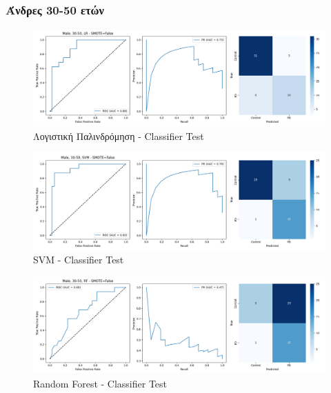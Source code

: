 \documentclass[12pt]{report}
\begin{document}
            \subsubsection*{Άνδρες 30-50 ετών}
                \vspace{-0.5cm}
                \begin{figure}[H]
                    \centering
                    \includegraphics[width=1\textwidth]{ML/Predict/DEG/AUC/results_stratified_Male_30-50_LR_useSMOTE_False.png}
                    \caption*{Λογιστική Παλινδρόμηση - Classifier Test}
                    \label{fig:app_lr_males_30_50_test}
                \end{figure}
                \begin{figure}[H]
                    \centering
                    \includegraphics[width=1\textwidth]{ML/Predict/DEG/AUC/results_stratified_Male_30-50_SVM_useSMOTE_False.png}
                    \caption*{SVM - Classifier Test}
                    \label{fig:app_svm_males_30_50_test}
                \end{figure}
                \begin{figure}[H]
                    \centering
                    \includegraphics[width=1\textwidth]{ML/Predict/DEG/AUC/results_stratified_Male_30-50_RF_useSMOTE_False.png}
                    \caption*{Random Forest - Classifier Test}
                    \label{fig:app_rf_males_30_50_test}
                \end{figure}                
\end{document}
